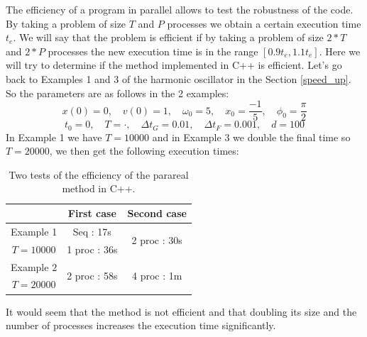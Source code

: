 The efficiency of a program in parallel allows to test the robustness of the code. By taking a problem of size $T$ and $P$ processes we obtain a certain execution time $t_e$. We will say that the problem is efficient if by taking a problem of size $2*T$ and $2*P$ processes the new execution time is in the range $[0.9t_e,1.1t_e]$. Here we will try to determine if the method implemented in C++ is efficient. Let's go back to Examples 1 and 3 of the harmonic oscillator in the Section \ref{speed_up}. So the parameters are as follows in the 2 examples:
$$x(0) = 0, \quad v(0) = 1, \quad \omega_0 = 5, \quad x_0 = \frac{-1}{5}, \quad \phi_0 = \frac{\pi}{2}$$
$$t_0=0, \quad T=\cdot, \quad \Delta t_G=0.01, \quad \Delta t_F=0.001, \quad d=100$$
In Example 1 we have $T=10000$ and in Example 3 we double the final time so $T=20000$, we then get the following execution times:
\renewcommand{\arraystretch}{1.2}
\begin{table}[H]
	\centering
	\begin{tabular}{| c || c | c |}
		\hline
		 & First case & Second case \\
		\hline
		Example 1 & Seq : 17s & \multirow{2}{2 cm}{2 proc : 30s}  \\
		$T=10000$ & 1 proc : 36s &  \\
		\hline 
		Example 2 & \multirow{2}{2 cm}{2 proc : 58s} & \multirow{2}{2 cm}{4 proc : 1m}  \\
		$T=20000$ & &  \\
		\hline 
	\end{tabular}
	\caption{Two tests of the efficiency of the parareal method in C++.}
	\label{efficiency}
\end{table}
\noindent It would seem that the method is not efficient and that doubling its size and the number of processes increases the execution time significantly. \\

